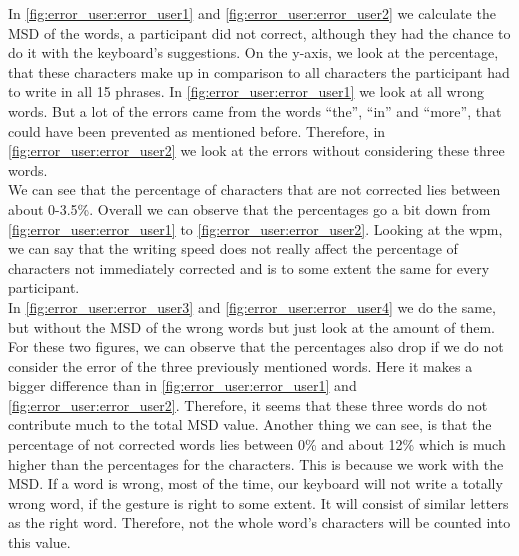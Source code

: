 In \cref{fig:error_user:error_user1} and \cref{fig:error_user:error_user2} we calculate the MSD of the words, a participant did not correct, although they had the chance to do it with the keyboard's suggestions. On the y-axis, we look at the percentage, that these characters make up in comparison to all characters the participant had to write in all 15 phrases. In \cref{fig:error_user:error_user1} we look at all wrong words. But a lot of the errors came from the words ``the'', ``in'' and ``more'', that could have been prevented as mentioned before. Therefore, in \cref{fig:error_user:error_user2} we look at the errors without considering these three words.\\
We can see that the percentage of characters that are not corrected lies between about 0-3.5\%. Overall we can observe that the percentages go a bit down from \cref{fig:error_user:error_user1} to \cref{fig:error_user:error_user2}. Looking at the wpm, we can say that the writing speed does not really affect the percentage of characters not immediately corrected and is to some extent the same for every participant.\\
In \cref{fig:error_user:error_user3} and \cref{fig:error_user:error_user4} we do the same, but without the MSD of the wrong words but just look at the amount of them.\\
For these two figures, we can observe that the percentages also drop if we do not consider the error of the three previously mentioned words. Here it makes a bigger difference than in \cref{fig:error_user:error_user1} and \cref{fig:error_user:error_user2}. Therefore, it seems that these three words do not contribute much to the total MSD value. 
Another thing we can see, is that the percentage of not corrected words lies between 0\% and about 12\% which is much higher than the percentages for the characters. This is because we work with the MSD. If a word is wrong, most of the time, our keyboard will not write a totally wrong word, if the gesture is right to some extent. It will consist of similar letters as the right word. Therefore, not the whole word's characters will be counted into this value.\\

